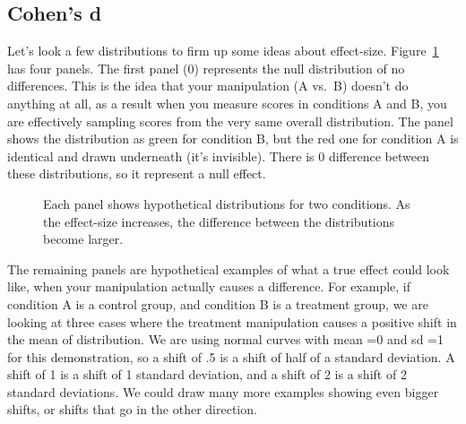 \documentclass[
  letterpaper,
  DIV=11,
  numbers=noendperiod]{scrreprt}
\begin{document}
\subsection{Cohen's d}\label{cohens-d-1}

Let's look a few distributions to firm up some ideas about effect-size.
Figure~\ref{fig-13effectdists} has four panels. The first panel (0)
represents the null distribution of no differences. This is the idea
that your manipulation (A vs.~B) doesn't do anything at all, as a result
when you measure scores in conditions A and B, you are effectively
sampling scores from the very same overall distribution. The panel shows
the distribution as green for condition B, but the red one for condition
A is identical and drawn underneath (it's invisible). There is 0
difference between these distributions, so it represent a null effect.

\begin{figure}


\caption{\label{fig-13effectdists}Each panel shows hypothetical
distributions for two conditions. As the effect-size increases, the
difference between the distributions become larger.}

\end{figure}%

The remaining panels are hypothetical examples of what a true effect
could look like, when your manipulation actually causes a difference.
For example, if condition A is a control group, and condition B is a
treatment group, we are looking at three cases where the treatment
manipulation causes a positive shift in the mean of distribution. We are
using normal curves with mean =0 and sd =1 for this demonstration, so a
shift of .5 is a shift of half of a standard deviation. A shift of 1 is
a shift of 1 standard deviation, and a shift of 2 is a shift of 2
standard deviations. We could draw many more examples showing even
bigger shifts, or shifts that go in the other direction.
\end{document}
